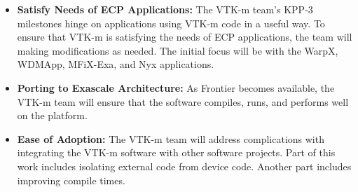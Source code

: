 \begin{itemize}
\item \textbf{Satisfy Needs of ECP Applications:}
  The VTK-m team's KPP-3 milestones hinge on applications using VTK-m code in a useful way.
  To ensure that VTK-m is satisfying the needs of ECP applications, the team will making modifications as needed.
  The initial focus will be with the WarpX, WDMApp, MFiX-Exa, and Nyx applications.
\item \textbf{Porting to Exascale Architecture:}
  As Frontier becomes available, the VTK-m team will ensure that the software compiles, runs, and performs well on the platform.
\item \textbf{Ease of Adoption:}
  The VTK-m team will address complications with integrating the VTK-m software with other software projects.
  Part of this work includes isolating external code from device code.
  Another part includes improving compile times.
\end{itemize}
